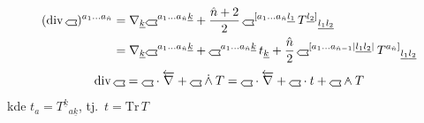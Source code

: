 \begin{veta}[Věta]
\begin{align*}
  (\mathrm{div}\,\gmIhustsym)^{a_1\dots a_{\hat n}}
  &= \nabla_{\underline k}\gmIhustsym^{a_1\dots a_{\hat n}\underline k}
   + \frac{\hat n+2}{2}\,\gmIhustsym^{[a_1\dots a_{\hat n}\underline{l_1}}\,T^{\underline{l_2}]}{}_{\underline{l_1}\underline{l_2}} \\
  &= \nabla_{\underline k}\gmIhustsym^{a_1\dots a_{\hat n}\underline k}
   + \gmIhustsym^{a_1\dots a_{\hat n}\underline k}\,t_{\underline k}
   + \frac{\hat n}{2}\,\gmIhustsym^{[a_1\dots a_{\hat n-1}|\underline{l_1}\underline{l_2}|}\,T^{a_{\hat n}]}{}_{\underline{l_1}\underline{l_2}}
\end{align*}
\[
  \mathrm{div}\,\gmIhustsym = \gmIhustsym\cdot\overleftarrow{\nabla} + \gmIhustsym\gmIdotwedge T
  = \gmIhustsym\cdot\overleftarrow{\nabla} + \gmIhustsym\cdot t + \gmIhustsym\gmIwedgedot T
\]
\quad kde \quad $t_a = T^{\underline k}{}_{a\underline k}$, \quad tj.\ $t = \mathrm{Tr}\,T$
\end{veta}

